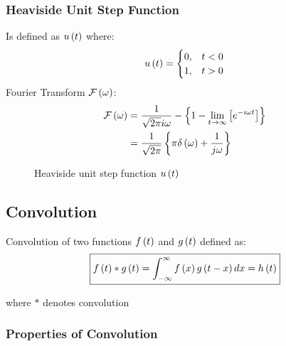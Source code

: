 \subsubsection{Heaviside Unit Step Function}
Is defined as $u\left(t\right)$ where:
\begin{equation}
    u\left(t\right)=
    \begin{cases}
        0, & t < 0\\
        1, & t > 0 
    \end{cases}
\end{equation}
Fourier Transform $\mathcal{F}\left(\omega\right)$:
\begin{align}
    \mathcal{F}\left(\omega\right)&=\frac{1}{\sqrt{2\pi}i\omega}-\left\{1-\lim\limits_{t\to\infty}\left[e^{-i\omega t}\right]\right\}\nonumber\\
    &=\frac{1}{\sqrt{2\pi}}\left\{\pi\delta\left(\omega\right)+\frac{1}{j\omega}\right\}
\end{align}
\begin{figure}[H]
    \centering
    \caption{Heaviside unit step function $u\left(t\right)$}
    \label{fig:1.7}
\end{figure}\vspace{-5ex}
\subsection{Convolution}
Convolution of two functions $f\left(t\right)$ and $g\left(t\right)$ defined as:
\begin{equation}
    \boxed{f\left(t\right)*g\left(t\right)=\int_{-\infty}^{\infty}f\left(x\right)g\left(t-x\right)dx=h\left(t\right)}
\end{equation}
\begin{center}
    where $*$ denotes convolution
\end{center}\vspace{-2.5ex}
\subsubsection{Properties of Convolution}

